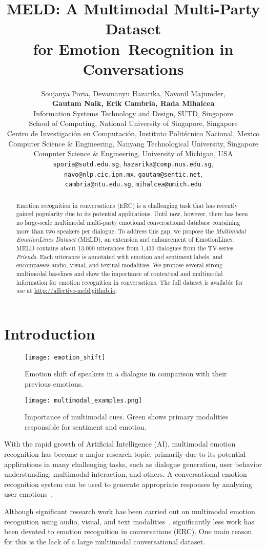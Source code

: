 \documentclass[11pt,a4paper]{article}
\title{MELD: A Multimodal Multi-Party Dataset\\ for Emotion~Recognition in Conversations}
\author{Soujanya Poria, Devamanyu Hazarika, Navonil Majumder,\\ \textbf{Gautam Naik, Erik Cambria, Rada Mihalcea}\\
		Information Systems Technology and Design, SUTD, Singapore \\ 
		School of Computing, National University of Singapore, Singapore \\
Centro de Investigaci\'on en Computaci\'on, Instituto Polit\'ecnico Nacional, Mexico\\
Computer Science \& Engineering, Nanyang Technological University, Singapore\\
Computer Science \& Engineering, University of Michigan, USA\\
{\tt sporia@sutd.edu.sg}, {\tt hazarika@comp.nus.edu.sg},\\ {\tt navo@nlp.cic.ipn.mx}, {\tt gautam@sentic.net},\\ {\tt cambria@ntu.edu.sg}, {\tt mihalcea@umich.edu} \\}
\date{}
\begin{document}
\maketitle
\begin{abstract}
 Emotion recognition in conversations (ERC) is a challenging task that has recently gained popularity due to its potential applications. Until now, however, there has been no large-scale multimodal multi-party emotional conversational database containing more than two speakers per dialogue. To address this gap, we propose the \emph{Multimodal EmotionLines Dataset} (MELD), an extension and enhancement of EmotionLines. MELD contains about 13,000 utterances from 1,433 dialogues from the TV-series \textit{Friends}. Each utterance is annotated with emotion and sentiment labels, and encompasses audio, visual, and textual modalities. We propose several strong multimodal baselines and show the importance of contextual and multimodal information for emotion recognition in conversations. The full dataset is available for use at \url{http://affective-meld.github.io}.
 
\end{abstract}


\section{Introduction} \label{sec:intro}


\begin{figure*}[t] 
	\centering 
	\texttt{[image: emotion\_shift]} 
	\caption[]{Emotion shift of speakers in a dialogue in comparison with their previous emotions.}
	\label{fig:emoc}
\end{figure*}
\begin{figure}[t] 
	\centering 
	\texttt{[image: multimodal\_examples.png]} 
	\caption[]{Importance of multimodal cues. Green shows primary modalities responsible for sentiment and emotion.}
	\label{fig:multimodal_examples}
\end{figure}
With the rapid growth of Artificial Intelligence (AI), multimodal emotion recognition has become a major research topic, primarily due to its potential applications in many challenging tasks, such as dialogue generation, user behavior understanding, multimodal interaction, and others. A conversational emotion recognition system can be used to generate appropriate responses by analyzing user emotions~\cite{zhou2017emotional,rashkin2018know}.

Although significant research work has been carried out on multimodal emotion recognition using audio, visual, and text modalities~\citep{zadeh2016deep,wollmer2013youtube}, significantly less work has been devoted to emotion recognition in conversations (ERC). One main reason for this is the lack of a large multimodal conversational dataset. 
\end{document}
